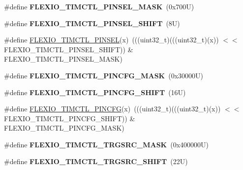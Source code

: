 \begin{DoxyCompactItemize}
\#define {\bfseries F\+L\+E\+X\+I\+O\+\_\+\+T\+I\+M\+C\+T\+L\+\_\+\+P\+I\+N\+S\+E\+L\+\_\+\+M\+A\+SK}~(0x700\+U)
\item 
\mbox{\label{group___f_l_e_x_i_o___register___masks_gae9ea4fb37abfa9b126db47944f9feb5d}} 
\#define {\bfseries F\+L\+E\+X\+I\+O\+\_\+\+T\+I\+M\+C\+T\+L\+\_\+\+P\+I\+N\+S\+E\+L\+\_\+\+S\+H\+I\+FT}~(8\+U)
\item 
\#define \mbox{\hyperlink{group___f_l_e_x_i_o___register___masks_gac43cf2fa69cb5fb58d5a8770659466c6}{F\+L\+E\+X\+I\+O\+\_\+\+T\+I\+M\+C\+T\+L\+\_\+\+P\+I\+N\+S\+EL}}(x)~(((uint32\+\_\+t)(((uint32\+\_\+t)(x)) $<$$<$ F\+L\+E\+X\+I\+O\+\_\+\+T\+I\+M\+C\+T\+L\+\_\+\+P\+I\+N\+S\+E\+L\+\_\+\+S\+H\+I\+FT)) \& F\+L\+E\+X\+I\+O\+\_\+\+T\+I\+M\+C\+T\+L\+\_\+\+P\+I\+N\+S\+E\+L\+\_\+\+M\+A\+SK)
\item 
\mbox{\label{group___f_l_e_x_i_o___register___masks_ga991820ff204751bdab541b92e58de581}} 
\#define {\bfseries F\+L\+E\+X\+I\+O\+\_\+\+T\+I\+M\+C\+T\+L\+\_\+\+P\+I\+N\+C\+F\+G\+\_\+\+M\+A\+SK}~(0x30000\+U)
\item 
\mbox{\label{group___f_l_e_x_i_o___register___masks_ga09f6702fa5abe7918d06a5105211cc09}} 
\#define {\bfseries F\+L\+E\+X\+I\+O\+\_\+\+T\+I\+M\+C\+T\+L\+\_\+\+P\+I\+N\+C\+F\+G\+\_\+\+S\+H\+I\+FT}~(16\+U)
\item 
\#define \mbox{\hyperlink{group___f_l_e_x_i_o___register___masks_ga742d777e5f0947554f6d178b3baad5ee}{F\+L\+E\+X\+I\+O\+\_\+\+T\+I\+M\+C\+T\+L\+\_\+\+P\+I\+N\+C\+FG}}(x)~(((uint32\+\_\+t)(((uint32\+\_\+t)(x)) $<$$<$ F\+L\+E\+X\+I\+O\+\_\+\+T\+I\+M\+C\+T\+L\+\_\+\+P\+I\+N\+C\+F\+G\+\_\+\+S\+H\+I\+FT)) \& F\+L\+E\+X\+I\+O\+\_\+\+T\+I\+M\+C\+T\+L\+\_\+\+P\+I\+N\+C\+F\+G\+\_\+\+M\+A\+SK)
\item 
\mbox{\label{group___f_l_e_x_i_o___register___masks_gae83bad8d846f409f0204f56daa843a5c}} 
\#define {\bfseries F\+L\+E\+X\+I\+O\+\_\+\+T\+I\+M\+C\+T\+L\+\_\+\+T\+R\+G\+S\+R\+C\+\_\+\+M\+A\+SK}~(0x400000\+U)
\item 
\mbox{\label{group___f_l_e_x_i_o___register___masks_gaa472d2e814d71c6a6fa064d31980267c}} 
\#define {\bfseries F\+L\+E\+X\+I\+O\+\_\+\+T\+I\+M\+C\+T\+L\+\_\+\+T\+R\+G\+S\+R\+C\+\_\+\+S\+H\+I\+FT}~(22\+U)

\end{DoxyCompactItemize}

